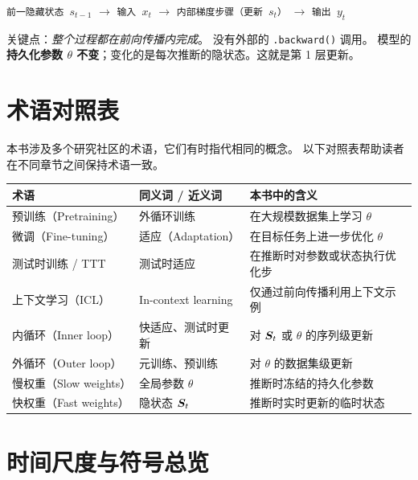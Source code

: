 \begin{center}
\texttt{前一隐藏状态 $s_{t-1}$} $\to$ \texttt{输入 $x_t$} $\to$
\texttt{内部梯度步骤（更新 $s_t$）} $\to$ \texttt{输出 $y_t$}
\end{center}

关键点：\emph{整个过程都在前向传播内完成}。
没有外部的 \texttt{.backward()} 调用。
模型的\textbf{持久化参数 $\theta$ 不变}；变化的是每次推断的隐状态。这就是第 1 层更新。

\section{术语对照表}
\label{sec:intro_terminology}

本书涉及多个研究社区的术语，它们有时指代相同的概念。
以下对照表帮助读者在不同章节之间保持术语一致。

\begin{center}
\begin{tabular}{p{3.5cm} p{3.5cm} p{5cm}}
\toprule
\textbf{术语} & \textbf{同义词 / 近义词} & \textbf{本书中的含义} \\
\midrule
预训练（Pretraining）
& 外循环训练
& 在大规模数据集上学习 $\theta$ \\
微调（Fine-tuning）
& 适应（Adaptation）
& 在目标任务上进一步优化 $\theta$ \\
测试时训练 / TTT
& 测试时适应
& 在推断时对参数或状态执行优化步 \\
上下文学习（ICL）
& In-context learning
& 仅通过前向传播利用上下文示例 \\
内循环（Inner loop）
& 快适应、测试时更新
& 对 $\boldsymbol{S}_t$ 或 $\theta$ 的序列级更新 \\
外循环（Outer loop）
& 元训练、预训练
& 对 $\theta$ 的数据集级更新 \\
慢权重（Slow weights）
& 全局参数 $\theta$
& 推断时冻结的持久化参数 \\
快权重（Fast weights）
& 隐状态 $\boldsymbol{S}_t$
& 推断时实时更新的临时状态 \\
\bottomrule
\end{tabular}
\end{center}

\section{时间尺度与符号总览}
\label{sec:intro_notation}

